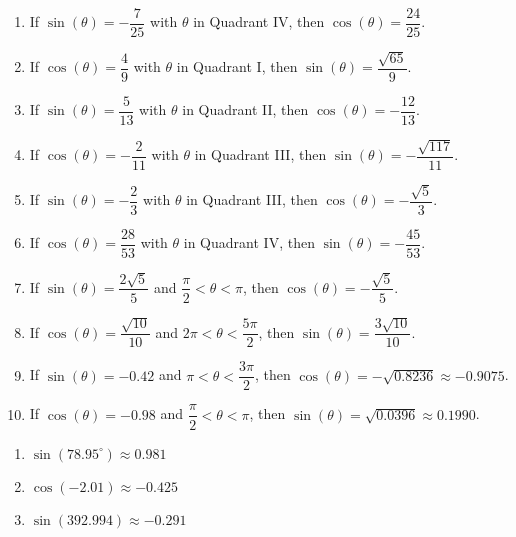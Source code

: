 \begin{enumerate}

\setcounter{enumi}{\value{HW}}

\item If $\sin(\theta) = -\dfrac{7}{25}$ with $\theta$ in Quadrant IV, then $\cos(\theta) = \dfrac{24}{25}$.
\item If $\cos(\theta) = \dfrac{4}{9}$ with $\theta$ in Quadrant I, then $\sin(\theta) = \dfrac{\sqrt{65}}{9}$.
\item If $\sin(\theta) = \dfrac{5}{13}$ with $\theta$ in Quadrant II, then $\cos(\theta) = -\dfrac{12}{13}$.
\item If $\cos(\theta) = -\dfrac{2}{11}$ with $\theta$ in Quadrant III, then $\sin(\theta) = -\dfrac{\sqrt{117}}{11}$.
\item If $\sin(\theta) = -\dfrac{2}{3}$ with $\theta$ in Quadrant III, then $\cos(\theta) = -\dfrac{\sqrt{5}}{3}$.
\item If $\cos(\theta) = \dfrac{28}{53}$ with $\theta$ in Quadrant IV, then $\sin(\theta) = -\dfrac{45}{53}$.
\item  If $\sin(\theta) = \dfrac{2\sqrt{5}}{5}$ and $\dfrac{\pi}{2} < \theta < \pi$, then $\cos(\theta) = -\dfrac{\sqrt{5}}{5}$.
\item  If $\cos(\theta) = \dfrac{\sqrt{10}}{10}$ and $2\pi < \theta < \dfrac{5\pi}{2}$, then $\sin(\theta)  = \dfrac{3 \sqrt{10}}{10}$.
\item  If $\sin(\theta) = -0.42$ and $\pi < \theta < \dfrac{3\pi}{2}$, then $\cos(\theta) = -\sqrt{0.8236} \approx -0.9075$.
\item  If $\cos(\theta) = -0.98$ and $\dfrac{\pi}{2} < \theta < \pi$, then $\sin(\theta) = \sqrt{0.0396} \approx 0.1990$.

\setcounter{HW}{\value{enumi}}

\end{enumerate}


\begin{multicols}{3}

\begin{enumerate}

\setcounter{enumi}{\value{HW}}

\item $\sin(78.95^{\circ}) \approx 0.981$
\item $\cos(-2.01) \approx -0.425$
\item $\sin(392.994) \approx -0.291$

\setcounter{HW}{\value{enumi}}

\end{enumerate}

\end{multicols}

